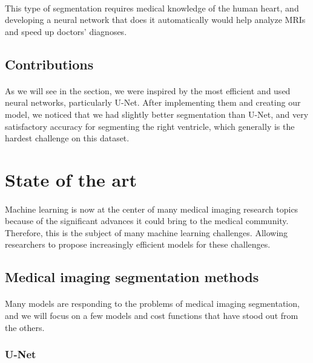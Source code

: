 \documentclass[english]{article}
\begin{document}
\paragraph{}
This type of segmentation requires medical knowledge of the human heart, and developing a neural network that does it automatically would help analyze MRIs and speed up doctors' diagnoses.

\subsection{Contributions}
\paragraph{}
As we will see in the  section, we were inspired by the most efficient and used neural networks, particularly U-Net. After implementing them and creating our model, we noticed that we had slightly better segmentation than U-Net, and very satisfactory accuracy for segmenting the right ventricle, which generally is the hardest challenge on this dataset.


\section{State of the art}
\paragraph{}
Machine learning is now at the center of many medical imaging research topics because of the significant advances it could bring to the medical community. Therefore, this is the subject of many machine learning challenges. Allowing researchers to propose increasingly efficient models for these challenges.

\subsection{Medical imaging segmentation methods}
\paragraph{}
Many models are responding to the problems of medical imaging segmentation, and we will focus on a few models and cost functions that have stood out from the others.

\subsubsection{U-Net}
\end{document}
